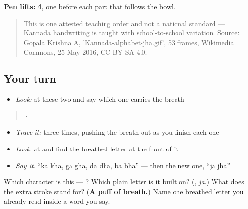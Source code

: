 \textbf{Pen lifts: 4}, one before each part that follows the bowl.

\begin{quote}
This is one attested teaching order and not a national standard — Kannada handwriting is taught with school-to-school variation. Source: Gopala Krishna A, 'Kannada-alphabet-jha.gif', 53 frames, Wikimedia Commons, 25 May 2016, CC BY-SA 4.0.
\end{quote}

\subsection*{Your turn}
\begin{itemize}
\raggedright
  \item \emph{Look:} at these two and say which one carries the breath
\end{itemize}

\begin{quote}
  ·  
\end{quote}

\begin{itemize}
\raggedright
  \item \emph{Trace it:}  three times, pushing the breath out as you finish each one
  \item \emph{Look:} at  and find the breathed letter at the front of it
  \item \emph{Say it:} \textquotedblleft{}ka kha, ga gha, da dha, ba bha\textquotedblright{} — then the new one, \textquotedblleft{}ja jha\textquotedblright{}
\end{itemize}

\begin{tcolorbox}[breakable,colback=teal!4,colframe=teal!35!black,title={Before you move on}]
Which character is this — ? Which plain letter is it built on? (\textbf{}, \emph{ja}.) What does the extra stroke stand for? (\textbf{A puff of breath.}) Name one breathed letter you already read inside a word you say.
\end{tcolorbox}
